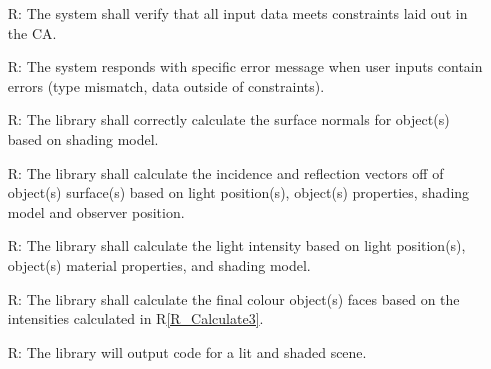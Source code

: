 \documentclass[12pt, titlepage]{article}
\newcounter{reqnum} %
\newcommand{\rref}[1]{R\ref{#1}}
\begin{document}
\begin{itemize}
	\item[R\refstepcounter{reqnum}\thereqnum \label{R_Inputs2}:]The system 
	shall verify that all input data meets constraints laid out in the CA.
	
	\item[R\refstepcounter{reqnum}\thereqnum \label{R_Inputs2Err}:] The system 
	responds with specific error message when user inputs contain errors (type 
	mismatch, data outside of constraints).
	
	\item[R\refstepcounter{reqnum}\thereqnum \label{R_Calculate1}:] The library 
	shall correctly calculate the surface normals for object(s) based on 
	shading model.
	
	\item[R\refstepcounter{reqnum}\thereqnum \label{R_Calculate2}:] The library 
	shall calculate the incidence and reflection vectors off of object(s) 
	surface(s) based on light position(s), object(s) properties, shading model 
	and observer position.
	
	\item[R\refstepcounter{reqnum}\thereqnum \label{R_Calculate3}:] The library 
	shall calculate the light intensity based on light position(s), object(s) 
	material properties, and shading model.
	
	\item[R\refstepcounter{reqnum}\thereqnum \label{R_Calculate4}:] The library 
	shall calculate the final colour object(s) faces based on the intensities 
	calculated in \rref{R_Calculate3}.
	
	\item[R\refstepcounter{reqnum}\thereqnum \label{R_Output}:] The library 
	will output code for a lit and shaded scene.
	

\end{itemize}
\end{document}
